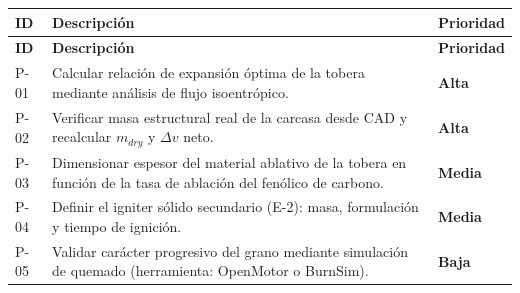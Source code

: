 \documentclass[11pt, a4paper]{article}
\begin{document}
\begin{longtable}{C{1cm} L{8cm} C{2.2cm}}
  \color{white}\textbf{ID} &
  \color{white}\textbf{Descripci\'{o}n} &
  \color{white}\textbf{Prioridad} \\
  \endfirsthead
  \color{white}\textbf{ID} &
  \color{white}\textbf{Descripci\'{o}n} &
  \color{white}\textbf{Prioridad} \\
  \endhead
  P-01 & Calcular relaci\'{o}n de expansi\'{o}n \'{o}ptima de la tobera mediante an\'{a}lisis de flujo isoentr\'{o}pico. & \textcolor{tlvred}{\textbf{Alta}} \\
  P-02 & Verificar masa estructural real de la carcasa desde CAD y recalcular $m_{dry}$ y $\Delta v$ neto. & \textcolor{tlvred}{\textbf{Alta}} \\
  P-03 & Dimensionar espesor del material ablativo de la tobera en funci\'{o}n de la tasa de ablaci\'{o}n del fen\'{o}lico de carbono. & \textcolor{tlvorange}{\textbf{Media}} \\
  P-04 & Definir el igniter s\'{o}lido secundario (E-2): masa, formulaci\'{o}n y tiempo de ignici\'{o}n. & \textcolor{tlvorange}{\textbf{Media}} \\
  P-05 & Validar car\'{a}cter progresivo del grano mediante simulaci\'{o}n de quemado (herramienta: OpenMotor o BurnSim). & \textbf{Baja} \\
\end{longtable}
\end{document}
